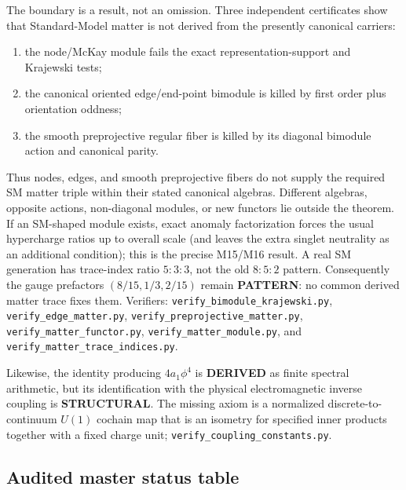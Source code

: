 \documentclass[12pt,a4paper]{article}
\theoremstyle{definition}
\begin{document}
The boundary is a result, not an omission.  Three independent certificates show that Standard-Model matter is not derived from the presently canonical carriers:
\begin{enumerate}
\item the node/McKay module fails the exact representation-support and Krajewski tests;
\item the canonical oriented edge/end-point bimodule is killed by first order plus orientation oddness;
\item the smooth preprojective regular fiber is killed by its diagonal bimodule action and canonical parity.
\end{enumerate}
Thus nodes, edges, and smooth preprojective fibers do not supply the required SM matter triple within their stated canonical algebras.  Different algebras, opposite actions, non-diagonal modules, or new functors lie outside the theorem.  If an SM-shaped module exists, exact anomaly factorization forces the usual hypercharge ratios up to overall scale (and leaves the extra singlet neutrality as an additional condition); this is the precise M15/M16 result.  A real SM generation has trace-index ratio $5:3:3$, not the old $8:5:2$ pattern.  Consequently the gauge prefactors $(8/15,1/3,2/15)$ remain \textbf{PATTERN}: no common derived matter trace fixes them.  Verifiers: \texttt{verify\_bimodule\_krajewski.py}, \texttt{verify\_edge\_matter.py}, \texttt{verify\_preprojective\_matter.py}, \texttt{verify\_matter\_functor.py}, \texttt{verify\_matter\_module.py}, and \texttt{verify\_matter\_trace\_indices.py}.

Likewise, the identity producing $4a_1\phi^4$ is \textbf{DERIVED} as finite spectral arithmetic, but its identification with the physical electromagnetic inverse coupling is \textbf{STRUCTURAL}.  The missing axiom is a normalized discrete-to-continuum $U(1)$ cochain map that is an isometry for specified inner products together with a fixed charge unit; \texttt{verify\_coupling\_constants.py}.

\subsection{Audited master status table}
\end{document}
